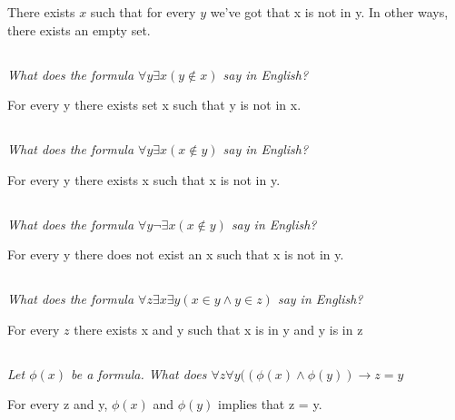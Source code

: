 \documentclass[11pt,oneside,titlepage]{book}
\begin{document}
There exists $x$ such that for every $y$ we've got that x is not in y. In other ways, there
exists an empty set.

\subsection{}

\textit{What does the formula $\forall y \exists x (y \notin x)$ say in English?}

For every y there exists set x such that y is not in x.

\subsection{}

\textit{What does the formula $\forall y \exists x (x \notin y)$ say in English?}

For every y there exists x such that x is not in y.

\subsection{}

\textit{What does the formula $\forall y \neg \exists x (x \notin y)$ say in English?}

For every y there does not exist an x such that x is not in y.

\subsection{}

\textit{What does the formula $\forall z \exists x \exists y (x \in y \land y \in z)$
  say in English?}

For every $z$ there exists x and y such that x is in y and y is in z

\subsection{}

\textit{Let $\phi(x)$ be a formula. What does $\forall z \forall y((\phi(x) \land \phi(y))
  \to z = y$}

For every z and y, $\phi(x)$ and $\phi(y)$ implies that z = y.

\subsection{}
\end{document}
